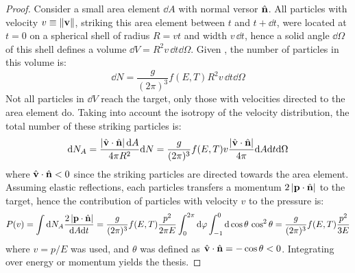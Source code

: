 \begin{proofbox}
  \begin{proof}
    Consider a small area element $ \dd A $ with normal versor $ \hat{\mathbf{n}} $. All particles with velocity $ v \equiv \left\lVert\mathbf{v}\right\rVert $, striking this area element between $ t $ and $ t + \dd t $, were located at $ t = 0 $ on a spherical shell of radius $ R = v t $ and width $ v \, \dd t $, hence a solid angle $ \dd \Omega $ of this shell defines a volume $ \dd V = R^2 v \, \dd t \dd \Omega $. Given , the number of particles in this volume is:
    \begin{equation*}
      \dd N = \frac{g}{(2\pi)^3} f(E,T) R^2 v \, \dd t \dd \Omega
    \end{equation*}
    Not all particles in $ \dd V $ reach the target, only those with velocities directed to the area element do. Taking into account the isotropy of the velocity distribution, the total number of these striking particles is:
    \begin{equation*}
      \mathrm{d} N_A = \frac{\left\lvert\hat{\mathbf{v}} \cdot \hat{\mathbf{n}}\right\rvert \mathrm{d} A}{4 \pi R^2} \mathrm{d} N = \frac{g}{(2\pi)^3} f(E,T) v \frac{\left\lvert\hat{\mathbf{v}} \cdot \hat{\mathbf{n}}\right\rvert}{4 \pi} \mathrm{d} A \mathrm{d} t \mathrm{d} \Omega
    \end{equation*}
    where $ \hat{\mathbf{v}} \cdot \hat{\mathbf{n}} < 0 $ since the striking particles are directed towards the area element. Assuming elastic reflections, each particles transfers a momentum $ 2 \left\lvert\mathbf{p} \cdot \hat{\mathbf{n}}\right\rvert $ to the target, hence the contribution of particles with velocity $ v $ to the pressure is:
    \begin{equation*}
      P(v) = \int \mathrm{d} N_A \frac{2 \left\lvert\mathbf{p} \cdot \hat{\mathbf{n}}\right\rvert}{\mathrm{d} A \mathrm{d} t} = \frac{g}{(2\pi)^3} f(E,T) \frac{p^2}{2\pi E} \int_0^{2\pi} \mathrm{d} \varphi \int_{-1}^0 \mathrm{d} \cos \theta \, \cos^2 \theta = \frac{g}{(2\pi)^3} f(E,T) \frac{p^2}{3E}
    \end{equation*}
    where $ v = p / E $ was used, and $ \theta $ was defined as $ \hat{\mathbf{v}} \cdot \hat{\mathbf{n}} = - \cos \theta < 0 $. Integrating over energy or momentum yields the thesis.
  \end{proof}
\end{proofbox}

